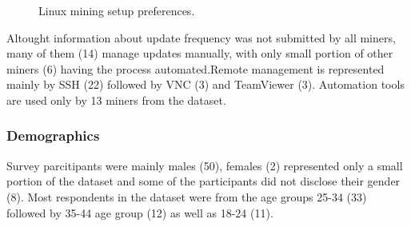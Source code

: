 \documentclass[
  printed, %
  table,   %
  lof,     %
  lot,     %
           oneside, color
]{fithesis3}
\begin{document}
\vspace{-2em}
\begin{center}
\begin{figure}[H]
\caption{Linux mining setup preferences.}
\label{chart:windowshabbits}\end{figure}\end{center}
\vspace{-1em}
Altought information about update frequency was not submitted by all miners, many of them (14) manage updates manually, with only small portion of other miners (6) having the process automated.Remote management is represented mainly by SSH (22) followed by VNC (3) and TeamViewer (3). Automation tools are used only by 13 miners from the dataset.
\subsubsection{Demographics}
Survey parcitipants were mainly males (50), females (2) represented only a small portion of the dataset and some of the participants did not disclose their gender (8). Most respondents in the dataset were from the age groups 25-34 (33) followed by 35-44 age group (12) as well as 18-24 (11).
\end{document}
